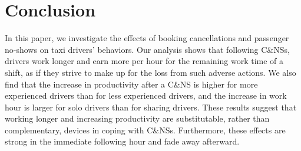 \documentclass[reviewmode]{restud}
\begin{document}





\section{Conclusion}


In this paper, we investigate the effects of booking cancellations and passenger no-shows on taxi drivers' behaviors. Our analysis shows that following C\&NSs, drivers work longer and earn more per hour for the remaining work time of a shift, as if they strive to make up for the loss from such adverse actions. We also find that the increase in productivity after a C\&NS is higher for more experienced drivers than for less experienced drivers, and the increase in work hour is larger for solo drivers than for sharing drivers. These results suggest that working longer and increasing productivity are substitutable, rather than complementary, devices in coping with C\&NSs. Furthermore, these effects are strong in the immediate following hour and fade away afterward.

\end{document}
